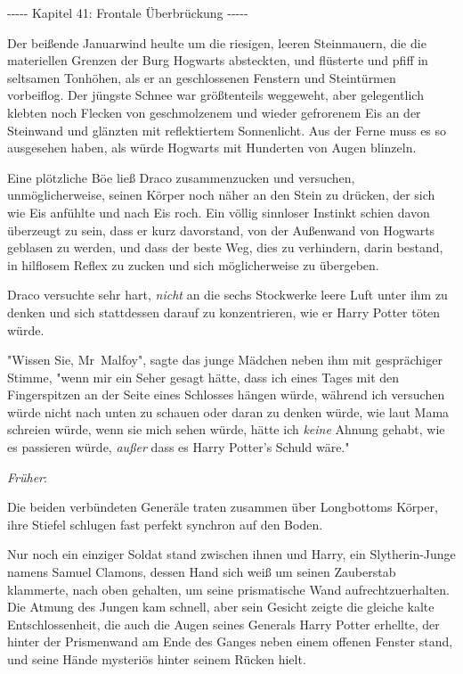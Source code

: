 

\hypertarget{frontale-uxfcberbruxfcckung}{%

-\/-\/-\/-\/- Kapitel 41: Frontale Überbrückung -\/-\/-\/-\/-

Der beißende Januarwind heulte um die riesigen, leeren Steinmauern, die die materiellen Grenzen der Burg Hogwarts absteckten, und flüsterte und pfiff in seltsamen Tonhöhen, als er an geschlossenen Fenstern und Steintürmen vorbeiflog. Der jüngste Schnee war größtenteils weggeweht, aber gelegentlich klebten noch Flecken von geschmolzenem und wieder gefrorenem Eis an der Steinwand und glänzten mit reflektiertem Sonnenlicht. Aus der Ferne muss es so ausgesehen haben, als würde Hogwarts mit Hunderten von Augen blinzeln.

Eine plötzliche Böe ließ Draco zusammenzucken und versuchen, unmöglicherweise, seinen Körper noch näher an den Stein zu drücken, der sich wie Eis anfühlte und nach Eis roch. Ein völlig sinnloser Instinkt schien davon überzeugt zu sein, dass er kurz davorstand, von der Außenwand von Hogwarts geblasen zu werden, und dass der beste Weg, dies zu verhindern, darin bestand, in hilflosem Reflex zu zucken und sich möglicherweise zu übergeben.

Draco versuchte sehr hart, \emph{nicht} an die sechs Stockwerke leere Luft unter ihm zu denken und sich stattdessen darauf zu konzentrieren, wie er Harry Potter töten würde.

"Wissen Sie, Mr~Malfoy", sagte das junge Mädchen neben ihm mit gesprächiger Stimme, "wenn mir ein Seher gesagt hätte, dass ich eines Tages mit den Fingerspitzen an der Seite eines Schlosses hängen würde, während ich versuchen würde nicht nach unten zu schauen oder daran zu denken würde, wie laut Mama schreien würde, wenn sie mich sehen würde, hätte ich \emph{keine} Ahnung gehabt, wie es passieren würde, \emph{außer} dass es Harry Potter's Schuld wäre."

\emph{Früher}:

Die beiden verbündeten Generäle traten zusammen über Longbottoms Körper, ihre Stiefel schlugen fast perfekt synchron auf den Boden.

Nur noch ein einziger Soldat stand zwischen ihnen und Harry, ein Slytherin-Junge namens Samuel Clamons, dessen Hand sich weiß um seinen Zauberstab klammerte, nach oben gehalten, um seine prismatische Wand aufrechtzuerhalten. Die Atmung des Jungen kam schnell, aber sein Gesicht zeigte die gleiche kalte Entschlossenheit, die auch die Augen seines Generals Harry Potter erhellte, der hinter der Prismenwand am Ende des Ganges neben einem offenen Fenster stand, und seine Hände mysteriös hinter seinem Rücken hielt.

}

